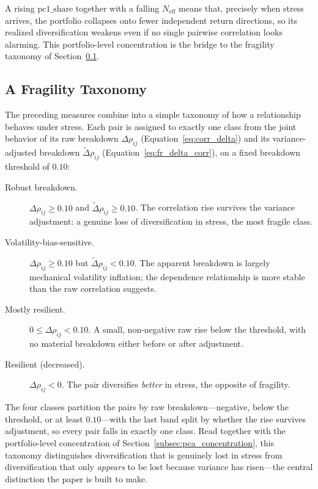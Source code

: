 A rising $\mathrm{pc1\_share}$ together with a falling $N_{\mathrm{eff}}$ means that, precisely when stress arrives, the portfolio collapses onto fewer independent return directions, so its realized diversification weakens even if no single pairwise correlation looks alarming. This portfolio-level concentration is the bridge to the fragility taxonomy of Section~\ref{subsec:fragility_taxonomy}.

\subsection{A Fragility Taxonomy}
\label{subsec:fragility_taxonomy}

The preceding measures combine into a simple taxonomy of how a relationship behaves under stress. Each pair is assigned to exactly one class from the joint behavior of its raw breakdown $\Delta\rho_{ij}$ (Equation~\eqref{eq:corr_delta}) and its variance-adjusted breakdown $\tilde{\Delta}\rho_{ij}$ (Equation~\eqref{eq:fr_delta_corr}), on a fixed breakdown threshold of $0.10$:
\begin{description}
  \item[Robust breakdown.] $\Delta\rho_{ij} \ge 0.10$ and $\tilde{\Delta}\rho_{ij} \ge 0.10$. The correlation rise survives the variance adjustment: a genuine loss of diversification in stress, the most fragile class.
  \item[Volatility-bias-sensitive.] $\Delta\rho_{ij} \ge 0.10$ but $\tilde{\Delta}\rho_{ij} < 0.10$. The apparent breakdown is largely mechanical volatility inflation; the dependence relationship is more stable than the raw correlation suggests.
  \item[Mostly resilient.] $0 \le \Delta\rho_{ij} < 0.10$. A small, non-negative raw rise below the threshold, with no material breakdown either before or after adjustment.
  \item[Resilient (decreased).] $\Delta\rho_{ij} < 0$. The pair diversifies \emph{better} in stress, the opposite of fragility.
\end{description}
The four classes partition the pairs by raw breakdown---negative, below the threshold, or at least $0.10$---with the last band split by whether the rise survives adjustment, so every pair falls in exactly one class. Read together with the portfolio-level concentration of Section~\ref{subsec:pca_concentration}, this taxonomy distinguishes diversification that is genuinely lost in stress from diversification that only \emph{appears} to be lost because variance has risen---the central distinction the paper is built to make.
